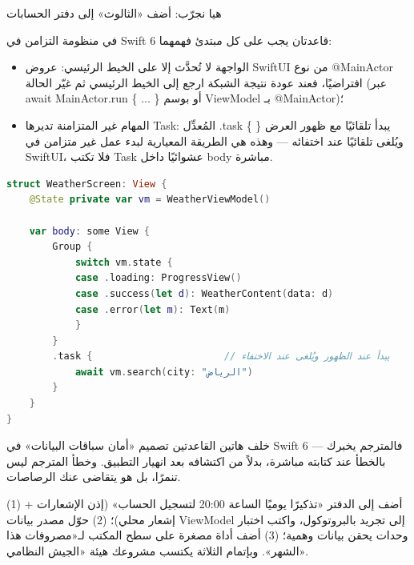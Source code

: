 \begin{tcbpractice}{هيا نجرّب: أضف «الثالوث» إلى دفتر الحسابات}

في منظومة التزامن في Swift 6 قاعدتان يجب على كل مبتدئ فهمهما:

\begin{itemize}
  \item الواجهة لا تُحدَّث إلا على الخيط الرئيسي: عروض SwiftUI من نوع @MainActor افتراضيًا، فعند عودة نتيجة الشبكة ارجع إلى الخيط الرئيسي ثم غيّر الحالة (عبر await MainActor.run \{ ... \} أو بوسم ViewModel بـ @MainActor)؛
  \item المهام غير المتزامنة تديرها Task: المُعدِّل .task \{ \} يبدأ تلقائيًا مع ظهور العرض ويُلغى تلقائيًا عند اختفائه — وهذه هي الطريقة المعيارية لبدء عمل غير متزامن في SwiftUI، فلا تكتب Task عشوائيًا داخل body مباشرة.
\end{itemize}

\begin{lstlisting}[language=Swift]
struct WeatherScreen: View {
    @State private var vm = WeatherViewModel()

    var body: some View {
        Group {
            switch vm.state {
            case .loading: ProgressView()
            case .success(let d): WeatherContent(data: d)
            case .error(let m): Text(m)
            }
        }
        .task {                       // يبدأ عند الظهور ويُلغى عند الاختفاء
            await vm.search(city: "الرياض")
        }
    }
}
\end{lstlisting}

خلف هاتين القاعدتين تصميم «أمان سباقات البيانات» في Swift 6 — فالمترجم يخبرك بالخطأ عند كتابته مباشرة، بدلاً من اكتشافه بعد انهيار التطبيق. وخطأ المترجم ليس تنمرًا، بل هو يتقاضى عنك الرصاصات.

(1) أضف إلى الدفتر «تذكيرًا يوميًا الساعة 20:00 لتسجيل الحساب» (إذن الإشعارات + إشعار محلي)؛ (2) حوّل مصدر بيانات ViewModel إلى تجريد بالبروتوكول، واكتب اختبار وحدات يحقن بيانات وهمية؛ (3) أضف أداة مصغرة على سطح المكتب لـ«مصروفات هذا الشهر». وبإتمام الثلاثة يكتسب مشروعك هيئة «الجيش النظامي».

\end{tcbpractice}

